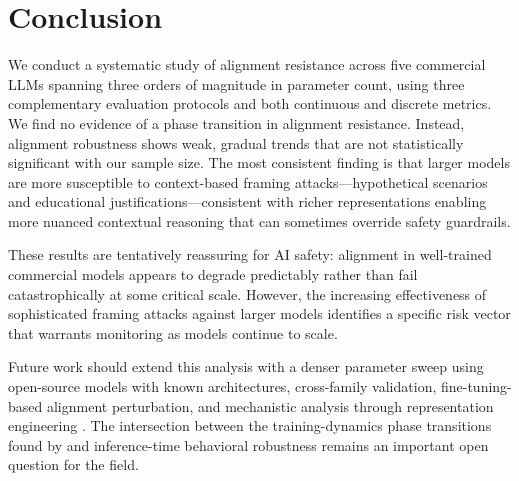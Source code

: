 \section{Conclusion}
\label{sec:conclusion}

We conduct a systematic study of alignment resistance across five commercial LLMs spanning three orders of magnitude in parameter count, using three complementary evaluation protocols and both continuous and discrete metrics. We find no evidence of a phase transition in alignment resistance. Instead, alignment robustness shows weak, gradual trends that are not statistically significant with our sample size. The most consistent finding is that larger models are more susceptible to context-based framing attacks---hypothetical scenarios and educational justifications---consistent with richer representations enabling more nuanced contextual reasoning that can sometimes override safety guardrails.

These results are tentatively reassuring for AI safety: alignment in well-trained commercial models appears to degrade predictably rather than fail catastrophically at some critical scale. However, the increasing effectiveness of sophisticated framing attacks against larger models identifies a specific risk vector that warrants monitoring as models continue to scale.

Future work should extend this analysis with a denser parameter sweep using open-source models with known architectures, cross-family validation, fine-tuning-based alignment perturbation, and mechanistic analysis through representation engineering \citep{zou2023representation}. The intersection between the training-dynamics phase transitions found by \citet{turner2025model} and inference-time behavioral robustness remains an important open question for the field.
